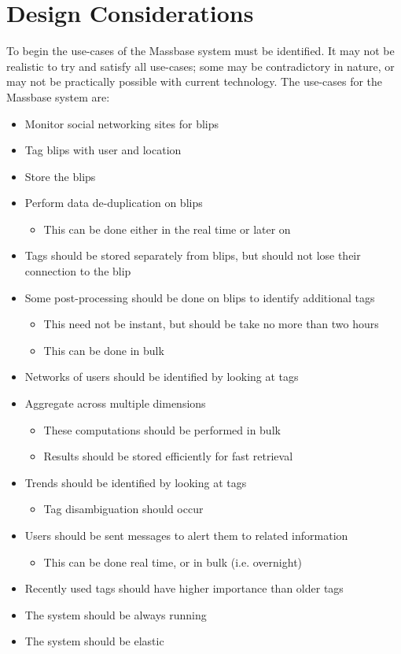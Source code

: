 \documentclass[12pt,a4paper]{article}
\begin{document}
\section{Design Considerations}
To begin the use-cases of the Massbase system must be identified. It may not be realistic to try and satisfy all use-cases; some may be contradictory in nature, or may not be practically possible with current technology. The use-cases for the Massbase system are:
\begin{itemize}
\item Monitor social networking sites for blips
\item Tag blips with user and location
\item Store the blips
\item Perform data de-duplication on blips
\begin{itemize}
\item This can be done either in the real time or later on
\end{itemize}
\item Tags should be stored separately from blips, but should not lose their connection to the blip
\item Some post-processing should be done on blips to identify additional tags
\begin{itemize}
\item This need not be instant, but should be take no more than two hours
\item This can be done in bulk
\end{itemize}
\item Networks of users should be identified by looking at tags
\item Aggregate across multiple dimensions
\begin{itemize}
\item These computations should be performed in bulk
\item Results should be stored efficiently for fast retrieval
\end{itemize}
\item Trends should be identified by looking at tags
\begin{itemize}
\item Tag disambiguation should occur
\end{itemize}
\item Users should be sent messages to alert them to related information
\begin{itemize}
\item This can be done real time, or in bulk (i.e. overnight)
\end{itemize}
\item Recently used tags should have higher importance than older tags
\item The system should be always running
\item The system should be elastic
\end{itemize}
\end{document}
